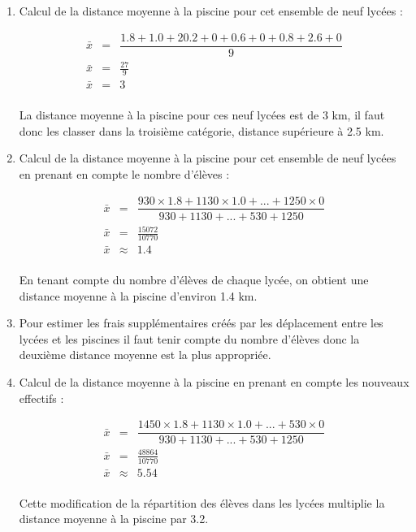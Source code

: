 \documentclass[12pt,a4paper]{article}
\begin{document}
\begin{enumerate}[label=\arabic*°]
	\item Calcul de la distance moyenne à la piscine pour cet ensemble de neuf lycées :
	
	\begin{eqnarray*}
		\bar{x} & = & \dfrac{\num{1.8} + \num{1.0} + \num{20.2} + \num{0} + \num{0.6} + \num{0} + \num{0.8} + \num{2.6} + \num{0}}{9} \\
		\bar{x} & = & \frac{27}{9} \\
		\bar{x} & = & 3 \\
	\end{eqnarray*}

	La distance moyenne à la piscine pour ces neuf lycées est de 3 km, il faut donc les classer dans la troisième catégorie, distance supérieure à \num{2.5} km.
	
	\item Calcul de la distance moyenne à la piscine pour cet ensemble de neuf lycées en prenant en compte le nombre d'élèves :
	
	\begin{small}
		\begin{eqnarray*}
			\bar{x} & = & \dfrac{\num{930} \times \num{1.8} + \num{1130} \times \num{1.0} + ... + \num{1250} \times \num{0}}{\num{930} + \num{1130} + ... + \num{530} + \num{1250} } \\
			\bar{x} & = & \frac{15072}{10770} \\
			\bar{x} & \approx & \num{1.4} \\
		\end{eqnarray*}
	\end{small}

	En tenant compte du nombre d'élèves de chaque lycée, on obtient une distance moyenne à la piscine d'environ \num{1.4} km.
	
	\item Pour estimer les frais supplémentaires créés par les déplacement entre les lycées et les piscines il faut tenir compte du nombre d'élèves donc la deuxième distance moyenne est la plus appropriée.
	
	\item Calcul de la distance moyenne à la piscine en prenant en compte les nouveaux effectifs :
	  
	  \begin{small}
	  	\begin{eqnarray*}
	  		\bar{x} & = & \dfrac{\num{1450} \times \num{1.8} + \num{1130} \times \num{1.0} + ... + \num{530} \times \num{0}}{\num{930} + \num{1130} + ... + \num{530} + \num{1250} } \\
	  		\bar{x} & = & \frac{48864}{10770} \\
	  		\bar{x} & \approx & \num{5.54} \\
	  	\end{eqnarray*}
	  \end{small}
  
  	Cette modification de la répartition des élèves dans les lycées multiplie la distance moyenne à la piscine par \num{3.2}.
\end{enumerate} 	
  	
\end{document}
